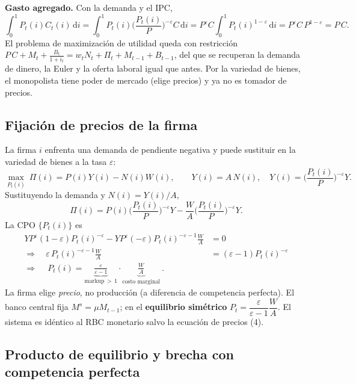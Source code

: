 \documentclass[11pt]{article}
\renewcommand{\boxed}[1]{#1}     %
\theoremstyle{definition}
\newcommand{\dd}{\,\mathrm{d}}
\begin{document}
\textbf{Gasto agregado.} Con la demanda y el IPC,
\begin{equation}
\int_{0}^{1}P_{t}(i)C_{t}(i)\dd i
=\int_{0}^{1}P_{t}(i)\Big(\frac{P_{t}(i)}{P}\Big)^{-\varepsilon}C\dd i
=P^{\varepsilon}C\int_{0}^{1}P_{t}(i)^{1-\varepsilon}\dd i
=P^{\varepsilon}C\,P^{1-\varepsilon}=P\,C .
\end{equation}
El problema de maximización de utilidad queda con restricción
$P\,C+M_{t}+\tfrac{B_{t}}{1+i_{t}}=w_{t}N_{t}+\Pi_{t}+M_{t-1}+B_{t-1}$, del que se recuperan la demanda
de dinero, la Euler y la oferta laboral igual que antes. Por la variedad de bienes, el monopolista
tiene poder de mercado (elige precios) y ya no es tomador de precios.

\subsection{Fijación de precios de la firma}

La firma $i$ enfrenta una demanda de pendiente negativa y puede sustituir en la variedad de bienes a
la tasa $\varepsilon$:
\begin{equation}
\max_{P_{t}(i)}\ \Pi(i)=P(i)Y(i)-N(i)W(i),
\qquad Y(i)=A\,N(i),\quad Y(i)=\Big(\frac{P_{t}(i)}{P}\Big)^{-\varepsilon}Y .
\end{equation}
Sustituyendo la demanda y $N(i)=Y(i)/A$,
\begin{equation}
\Pi(i)=P(i)\Big(\frac{P_{t}(i)}{P}\Big)^{-\varepsilon}Y-\frac{W}{A}\Big(\frac{P_{t}(i)}{P}\Big)^{-\varepsilon}Y .
\end{equation}
La CPO $\{P_{t}(i)\}$ es
\begin{align}
YP^{\varepsilon}(1-\varepsilon)P_{t}(i)^{-\varepsilon}
-YP^{\varepsilon}(-\varepsilon)P_{t}(i)^{-\varepsilon-1}\frac{W}{A}&=0
\\[2pt]
\Longrightarrow\quad
\varepsilon\,P_{t}(i)^{-\varepsilon-1}\frac{W}{A}&=(\varepsilon-1)P_{t}(i)^{-\varepsilon}
\\[2pt]
\Longrightarrow\quad
\boxed{\ P_{t}(i)=\underbrace{\frac{\varepsilon}{\varepsilon-1}}_{\text{markup}\,>\,1}\cdot\underbrace{\frac{W}{A}}_{\text{costo marginal}}\ }.
\end{align}
La firma elige \emph{precio}, no producción (a diferencia de competencia perfecta). El banco central
fija $M^{s}=\mu M_{t-1}$; en el \textbf{equilibrio simétrico}
$P_{t}=\dfrac{\varepsilon}{\varepsilon-1}\dfrac{W}{A}$. El sistema es idéntico al RBC monetario salvo la
ecuación de precios (4).

\subsection{Producto de equilibrio y brecha con competencia perfecta}
\end{document}
